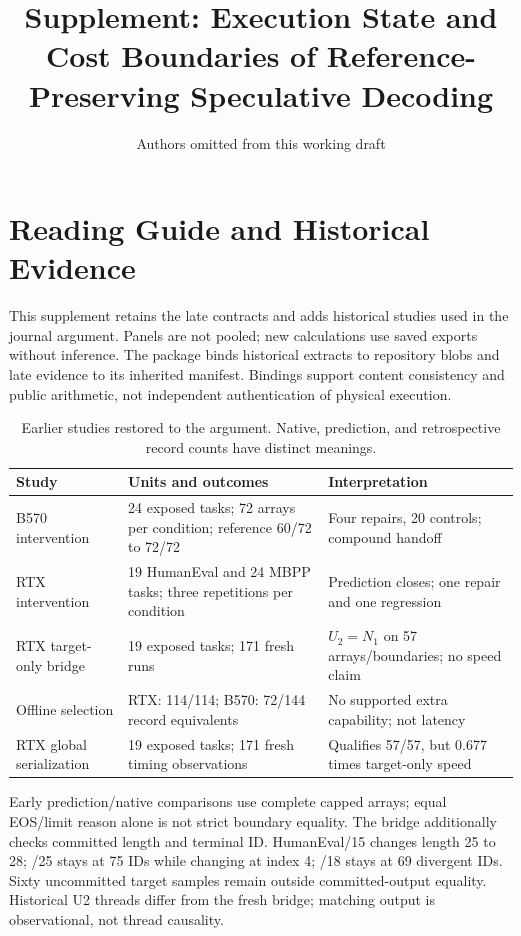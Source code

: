 \documentclass[preprint,12pt,nopreprintline]{elsarticle}
\begin{document}
\begin{frontmatter}
\title{Supplement: Execution State and Cost Boundaries of Reference-Preserving Speculative Decoding}
\author{Authors omitted from this working draft}
\end{frontmatter}
\suppressfloats[t]
\section{Reading Guide and Historical Evidence}
This supplement retains the late contracts and adds historical studies used in the journal argument. Panels are not pooled; new calculations use saved exports without inference. The package binds historical extracts to repository blobs and late evidence to its inherited manifest. Bindings support content consistency and public arithmetic, not independent authentication of physical execution.

\begin{table}[htbp]\centering\small
\caption{Earlier studies restored to the argument. Native, prediction, and retrospective record counts have distinct meanings.}
\begin{tabularx}{\linewidth}{@{}p{.22\linewidth}XX@{}}\toprule
Study & Units and outcomes & Interpretation\\\midrule
B570 intervention & 24 exposed tasks; 72 arrays per condition; reference 60/72 to 72/72 & Four repairs, 20 controls; compound handoff\\
RTX intervention & 19 HumanEval and 24 MBPP tasks; three repetitions per condition & Prediction closes; one repair and one regression\\
RTX target-only bridge & 19 exposed tasks; 171 fresh runs & $U_2=N_1$ on 57 arrays/boundaries; no speed claim\\
Offline selection & RTX: 114/114; B570: 72/144 record equivalents & No supported extra capability; not latency\\
RTX global serialization & 19 exposed tasks; 171 fresh timing observations & Qualifies 57/57, but 0.677 times target-only speed\\\bottomrule
\end{tabularx}
\end{table}

Early prediction/native comparisons use complete capped arrays; equal EOS/limit reason alone is not strict boundary equality. The bridge additionally checks committed length and terminal ID. HumanEval/15 changes length 25 to 28; /25 stays at 75 IDs while changing at index 4; /18 stays at 69 divergent IDs. Sixty uncommitted target samples remain outside committed-output equality. Historical U2 threads differ from the fresh bridge; matching output is observational, not thread causality.
\end{document}
